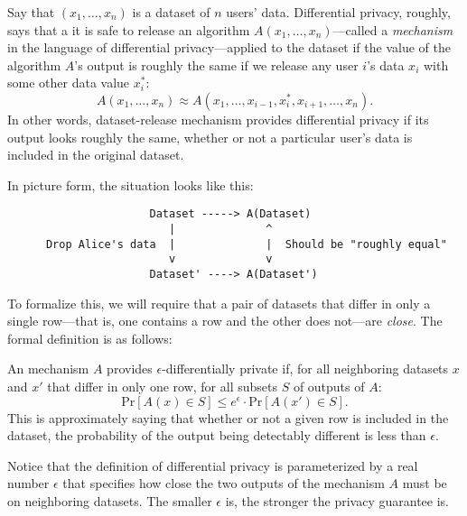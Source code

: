 Say that $(x_1, \dots, x_n)$ is a dataset of $n$ users' data.
Differential privacy, roughly, says that a it is safe to release
an algorithm $A(x_1, \dots, x_n)$---called a \emph{mechanism} in
the language of differential privacy---applied to the dataset if
the value of the algorithm $A$'s output is roughly the same if we
release any user $i$'s data $x_i$ with some other data value
$x^*_i$:
\[ A(x_1, \dots, x_n) \approx A(x_1, \dots, x_{i-1}, x^*_i, x_{i+1}, \dots, x_n). \]
In other words, dataset-release mechanism provides differential privacy 
if its output looks roughly the same, whether or not a particular user's 
data is included in the original dataset.

In picture form, the situation looks like this:
\begin{verbatim}
                      Dataset -----> A(Dataset)
                         |              ^
      Drop Alice's data  |              |  Should be "roughly equal"
                         v              v
                      Dataset' ----> A(Dataset')
\end{verbatim}

To formalize this, we will require that a pair of datasets that differ in only a single row---that is, one contains a row and the other does not---are \emph{close}. 
The formal definition is as follows:
\begin{definition}
	An mechanism $A$ provides $\epsilon$-differentially private if, for all neighboring datasets $x$ and $x'$ that differ in only one row, for all subsets $S$ of outputs of $A$:
	\[ \text{Pr}[A(x) \in S] \leq e^\epsilon \cdot \text{Pr}[A(x') \in S]. \]
   This is approximately saying that whether or not a given row is included in the dataset, the probability of the output being detectably different is less than $\epsilon$.
\end{definition}
Notice that the definition of differential privacy is parameterized by 
a real number $\epsilon$ that specifies how close the two outputs of
the mechanism $A$ must be on neighboring datasets.
The smaller $\epsilon$ is, the stronger the privacy guarantee is.

